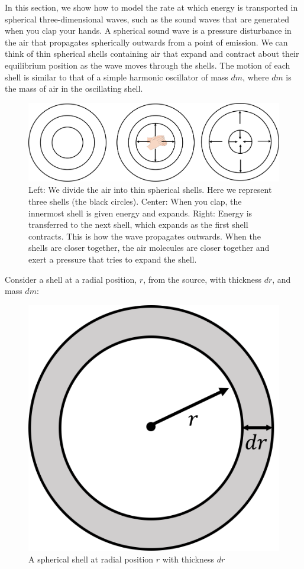 In this section, we show how to model the rate at which energy is transported in spherical three-dimensional waves, such as the sound waves that are generated when you clap your hands. A spherical sound wave is a pressure disturbance in the air that propagates spherically outwards from a point of emission. We can think of thin spherical shells containing air that expand and contract about their equilibrium position as the wave moves through the shells. The motion of each shell is similar to that of a simple harmonic oscillator of mass $dm$, where $dm$ is the mass of air in the oscillating shell.

\begin{figure}[!htbp]
\centering
\includegraphics[width=0.9\linewidth]{files/sphericalwave-bd8937037f04d3c07c03e3fda3b6640b.png}
\caption[]{Left: We divide the air into thin spherical shells. Here we represent three shells (the black circles). Center: When you clap, the innermost shell is given energy and expands. Right: Energy is transferred to the next shell, which expands as the first shell contracts. This is how the wave propagates outwards. When the shells are closer together, the air molecules are closer together and exert a pressure that tries to expand the shell.}
\label{fig:waves:sphericalwave}
\end{figure}

Consider a shell at a radial position, $r$, from the source, with thickness $dr$, and mass $dm$:

\begin{figure}[!htbp]
\centering
\includegraphics[width=0.3\linewidth]{files/sphericalshell-147d744283ba3a950fc86a57c3064a38.png}
\caption[]{A spherical shell at radial position $r$ with thickness $dr$}
\label{fig:waves:sphericalshell}
\end{figure}

